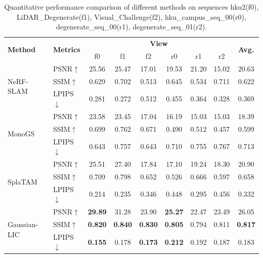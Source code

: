 \documentclass[lettersize,journal]{IEEEtran}
\begin{document}
\clearpage %
\begin{table}[!p] %
    \centering
    \vfill %
    \caption{Quantitative performance comparison of different methods on sequences hku2(f0), LiDAR_Degenerate(f1), Visual_Challenge(f2), hku_campus_seq_00(r0), degenerate_seq_00(r1), degenerate_seq_01(r2).}
    \renewcommand{\arraystretch}{1.0} %
    \setlength{\tabcolsep}{12pt} %
    \begin{tabular}{@{}llccccccc@{}} %
        \toprule
        \multirow{2}{*}{\textbf{Method}} & \multirow{2}{*}{\textbf{Metrics}} & \multicolumn{6}{c}{\textbf{View}} & \multirow{2}{*}{\textbf{Avg.}} \\
        \cmidrule(lr){3-8}
        & & f0 & f1 & f2 & r0 & r1 & r2 &  \\
        \midrule
        \multirow{3}{*}{NeRF-SLAM\cite{nerfslam}} & PSNR$\uparrow$ & 25.56 & 25.47 & 17.01 & 19.53 & 21.20 & 15.02 & 20.63 \\
        & SSIM$\uparrow$ & 0.629 & 0.702 & 0.513 & 0.645 & 0.534 & 0.711 & 0.622 \\
        & LPIPS$\downarrow$ & 0.281 & 0.272 & 0.512 & 0.455 & 0.364 & 0.328 & 0.369 \\
        \midrule
        \multirow{3}{*}{MonoGS\cite{monogs}} & PSNR$\uparrow$ & 23.58 & 23.45 & 17.04 & 16.19 & 15.03 & 15.03 & 18.39 \\
        & SSIM$\uparrow$ & 0.699 & 0.762 & 0.671 & 0.490 & 0.512 & 0.457 & 0.599 \\
        & LPIPS$\downarrow$ & 0.643 & 0.757 & 0.643 & 0.710 & 0.755 & 0.767 & 0.713 \\
        \midrule
        \multirow{3}{*}{SplaTAM\cite{splatam}} & PSNR$\uparrow$ & 25.51 & 27.40 & 17.84 & 17.10 & 19.24 & 18.30 & 20.90 \\
        & SSIM$\uparrow$ & 0.709 & 0.798 & 0.652 & 0.526 & 0.666 & 0.597 & 0.658 \\
        & LPIPS$\downarrow$ & 0.214 & 0.235 & 0.346 & 0.448 & 0.295 & 0.456 & 0.332 \\
        \midrule
        \multirow{3}{*}{Gaussian-LIC\cite{gaussianlic}} & PSNR$\uparrow$ & \textbf{29.89} & 31.28 & 23.90 & \textbf{25.27} & 22.47 & 23.49 & 26.05 \\
        & SSIM$\uparrow$ & \textbf{0.820} & \textbf{0.840} & \textbf{0.830} & \textbf{0.805} & 0.794 & 0.811 & \textbf{0.817} \\
        & LPIPS$\downarrow$ & \textbf{0.155} & 0.178 & \textbf{0.173} & \textbf{0.212} & 0.192 & 0.187 & 0.183 \\

\end{tabular}
\end{table}
\end{document}
